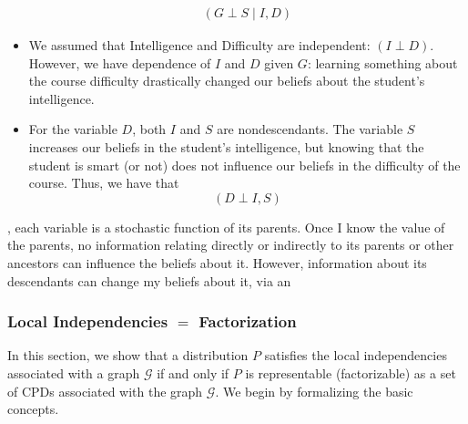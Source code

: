 \documentclass{article}
\begin{document}
\begin{exma}
\begin{itemize}
\begin{align*}
(G \perp S \mid I, D)
\end{align*}
\item We assumed that Intelligence and Difficulty are independent:
$(I \perp D) .$
However, we  have dependence of $I$ and $D$ given $G$: learning something about the course difficulty drastically changed our beliefs about the student’s intelligence. 
\item 
For the variable $D$, both $I$ and $S$ are nondescendants. The variable $S$ increases our beliefs in the student's intelligence, but knowing that the student is smart (or not) does not influence our beliefs in the difficulty of the course. Thus, we have that
$$(D \perp I, S)$$
\end{itemize}

, each variable is a stochastic function of its parents. Once I know the value of the parents, no information relating directly or indirectly to its parents or other ancestors can influence the beliefs about it. However, information about its descendants can change my beliefs about it, via an 
\end{exma}



\subsubsection{Local Independencies $=$ Factorization}
 In this section, we show that a distribution $P$ satisfies the local independencies associated with a graph $\mathcal{G}$ if and only if $P$ is representable  (factorizable) as a set of CPDs associated with the graph $\mathcal{G}$. We begin by formalizing the basic concepts.
\end{document}
